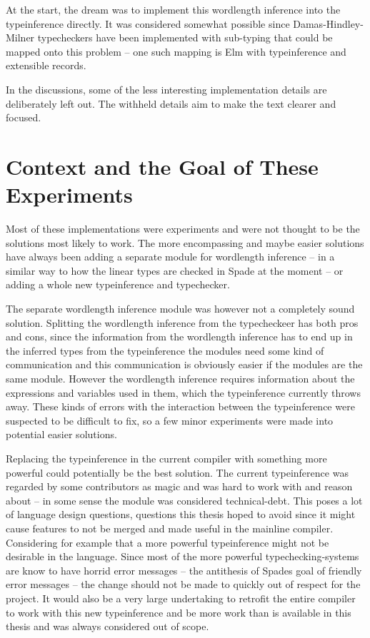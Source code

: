 \documentclass[msc,lith,english]{liuthesis}
\begin{document}
At the start, the dream was to implement this wordlength inference into the typeinference directly. It was considered somewhat possible since Damas-Hindley-Milner typecheckers have been implemented with sub-typing that could be mapped onto this problem -- one such mapping is Elm with typeinference and extensible records.

In the discussions, some of the less interesting implementation details are deliberately left out. The withheld details aim to make the text clearer and focused.

\section{Context and the Goal of These Experiments}
Most of these implementations were experiments and were not thought to be the solutions most likely to work. The more encompassing and maybe easier solutions have always been adding a separate module for wordlength inference -- in a similar way to how the linear types are checked in Spade at the moment -- or adding a whole new typeinference and typechecker.

The separate wordlength inference module was however not a completely sound solution. Splitting the wordlength inference from the typecheckeer has both pros and cons, since the information from the wordlength inference has to end up in the inferred types from the typeinference the modules need some kind of communication and this communication is obviously easier if the modules are the same module. However the wordlength inference requires information about the expressions and variables used in them, which the typeinference currently throws away. These kinds of errors with the interaction between the typeinference were suspected to be difficult to fix, so a few minor experiments were made into potential easier solutions.

Replacing the typeinference in the current compiler with something more powerful could potentially be the best solution. The current typeinference was regarded by some contributors as magic and was hard to work with and reason about -- in some sense the module was considered technical-debt. This poses a lot of language design questions, questions this thesis hoped to avoid since it might cause features to not be merged and made useful in the mainline compiler. Considering for example that a more powerful typeinference might not be desirable in the language. Since most of the more powerful typechecking-systems are know to have horrid error messages -- the antithesis of Spades goal of friendly error messages -- the change should not be made to quickly out of respect for the project. It would also be a very large undertaking to retrofit the entire compiler to work with this new typeinference and be more work than is available in this thesis and was always considered out of scope. 
\end{document}
